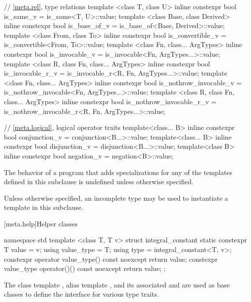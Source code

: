 \begin{codeblock}
{  // \ref{meta.rel}, type relations
  template <class T, class U> inline constexpr bool is_same_v
    = is_same<T, U>::value;
  template <class Base, class Derived> inline constexpr bool is_base_of_v
    = is_base_of<Base, Derived>::value;
  template <class From, class To> inline constexpr bool is_convertible_v
    = is_convertible<From, To>::value;
  template <class Fn, class... ArgTypes> inline constexpr bool is_invocable_v
    = is_invocable<Fn, ArgTypes...>::value;
  template <class R, class Fn, class... ArgTypes> inline constexpr bool is_invocable_r_v
    = is_invocable_r<R, Fn, ArgTypes...>::value;
  template <class Fn, class... ArgTypes> inline constexpr bool is_nothrow_invocable_v
    = is_nothrow_invocable<Fn, ArgTypes...>::value;
  template <class R, class Fn, class... ArgTypes> inline constexpr bool is_nothrow_invocable_r_v
    = is_nothrow_invocable_r<R, Fn, ArgTypes...>::value;

  // \ref{meta.logical}, logical operator traits
  template<class... B> inline constexpr bool conjunction_v = conjunction<B...>::value;
  template<class... B> inline constexpr bool disjunction_v = disjunction<B...>::value;
  template<class B> inline constexpr bool negation_v = negation<B>::value;
}
\end{codeblock}

\pnum
The behavior of a program that adds specializations for any of
the templates defined in this subclause is undefined unless otherwise specified.

\pnum
Unless otherwise specified, an incomplete type may be used
to instantiate a template in this subclause.

[meta.help]{Helper classes}

\begin{codeblock}
namespace std {
  template <class T, T v>
  struct integral_constant {
    static constexpr T value = v;
    using value_type = T;
    using type       = integral_constant<T, v>;
    constexpr operator value_type() const noexcept { return value; }
    constexpr value_type operator()() const noexcept { return value; }
  };
}
\end{codeblock}

%
%
%
%
\pnum
The class template ,
alias template , and
its associated 
 and 
are used as base classes to define
the interface for various type traits.

